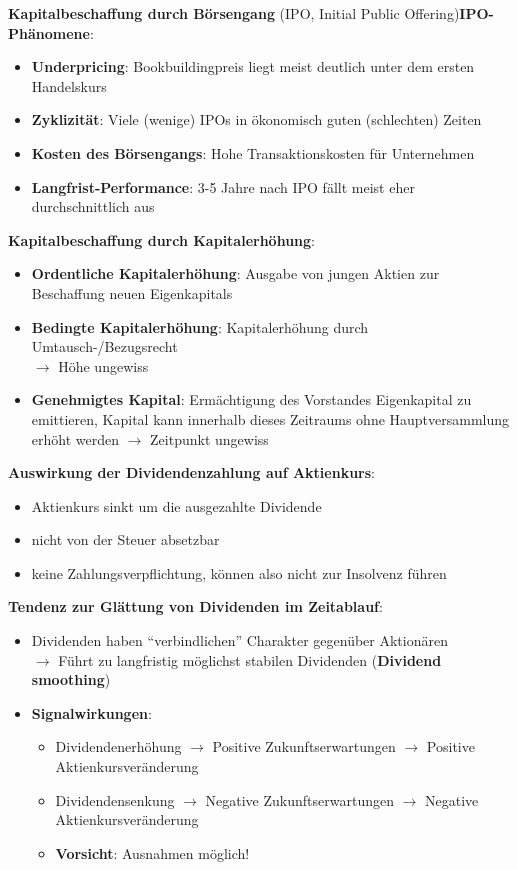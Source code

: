 \textbf{Kapitalbeschaffung durch Börsengang} (IPO, Initial Public Offering)\textbf{IPO-Phänomene}:
\begin{itemize}
	\item \textbf{Underpricing}: Bookbuildingpreis liegt meist deutlich unter dem ersten Handelskurs
	\item \textbf{Zyklizität}: Viele (wenige) IPOs in ökonomisch guten (schlechten) Zeiten
	\item \textbf{Kosten des Börsengangs}: Hohe Transaktionskosten für Unternehmen
	\item \textbf{Langfrist-Performance}: 3-5 Jahre nach IPO fällt meist eher durchschnittlich aus
\end{itemize}
\bigskip
\textbf{Kapitalbeschaffung durch Kapitalerhöhung}:
\begin{itemize}
	\item \textbf{Ordentliche Kapitalerhöhung}: Ausgabe von jungen Aktien zur Beschaffung neuen Eigenkapitals
	\item \textbf{Bedingte Kapitalerhöhung}: Kapitalerhöhung durch Umtausch-/Bezugsrecht\\ $\rightarrow$ Höhe ungewiss
	\item \textbf{Genehmigtes Kapital}: Ermächtigung des Vorstandes Eigenkapital zu emittieren, Kapital kann innerhalb dieses Zeitraums ohne Hauptversammlung erhöht werden 
	$\rightarrow$ Zeitpunkt ungewiss
\end{itemize}
\bigskip
\textbf{Auswirkung der Dividendenzahlung auf Aktienkurs}:
\begin{itemize}
	\item Aktienkurs sinkt um die ausgezahlte Dividende
	\item nicht von der Steuer absetzbar
	\item keine Zahlungsverpflichtung, können also nicht zur Insolvenz führen
\end{itemize}
\bigskip
\textbf{Tendenz zur Glättung von Dividenden im Zeitablauf}:
\begin{itemize}
	\item Dividenden haben \enquote{verbindlichen} Charakter gegenüber Aktionären\\
	$\rightarrow$ Führt zu langfristig möglichst stabilen Dividenden (\textbf{Dividend smoothing})
	\item \textbf{Signalwirkungen}:
	\begin{itemize}
		\item Dividendenerhöhung $\rightarrow$ Positive Zukunftserwartungen $\rightarrow$ Positive Aktienkursveränderung
		\item Dividendensenkung $\rightarrow$ Negative Zukunftserwartungen $\rightarrow$ Negative Aktienkursveränderung
		\item \textbf{Vorsicht}: Ausnahmen möglich!
	\end{itemize}
\end{itemize}
